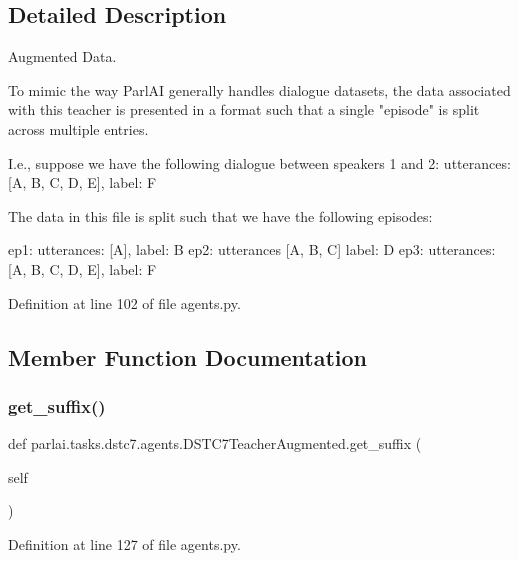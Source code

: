 \subsection{Detailed Description}
\begin{DoxyVerb}Augmented Data.

To mimic the way ParlAI generally handles dialogue datasets, the data associated
with this teacher is presented in a format such that a single "episode" is split
across multiple entries.

I.e., suppose we have the following dialogue between speakers 1 and 2:
utterances: [A, B, C, D, E],
label: F

The data in this file is split such that we have the following episodes:

ep1:
    utterances: [A],
    label: B
ep2:
    utterances [A, B, C]
    label: D
ep3:
    utterances: [A, B, C, D, E],
    label: F
\end{DoxyVerb}
 

Definition at line 102 of file agents.\+py.



\subsection{Member Function Documentation}
\mbox{\label{classparlai_1_1tasks_1_1dstc7_1_1agents_1_1DSTC7TeacherAugmented_aa14c386712516ba60af7af0ee7cadbf5}} 
\subsubsection{\texorpdfstring{get\+\_\+suffix()}{get\_suffix()}}
{\footnotesize\ttfamily def parlai.\+tasks.\+dstc7.\+agents.\+D\+S\+T\+C7\+Teacher\+Augmented.\+get\+\_\+suffix (\begin{DoxyParamCaption}\item[{}]{self }\end{DoxyParamCaption})}



Definition at line 127 of file agents.\+py.



